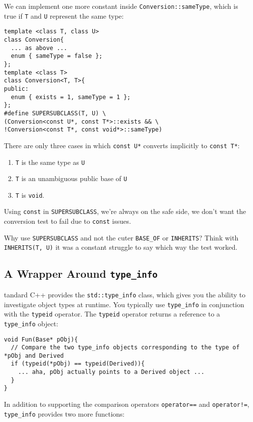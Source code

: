 We can implement one more constant inside
\texttt{Conversion::sameType}, which is true if \texttt{T} and
\texttt{U} represent the same type:

\begin{verbatim}
template <class T, class U>
class Conversion{
  ... as above ...
  enum { sameType = false };
};
template <class T>
class Conversion<T, T>{
public:
  enum { exists = 1, sameType = 1 };
};
#define SUPERSUBCLASS(T, U) \
(Conversion<const U*, const T*>::exists && \
!Conversion<const T*, const void*>::sameType)
\end{verbatim}

There are only three cases in which \texttt{const U*} converts
implicitly to \texttt{const T*}: 
\begin{enumerate}
\item \texttt{T} is the same type as \texttt{U}
\item \texttt{T} is an unambiguous public base of \texttt{U}
\item \texttt{T} is \texttt{void}.
\end{enumerate}

Using \texttt{const} in \texttt{SUPERSUBCLASS}, we're always on the
safe side, we don't want the conversion test to fail due to
\texttt{const} issues.

Why use \texttt{SUPERSUBCLASS} and not the cuter \texttt{BASE\_OF} or
\texttt{INHERITS}? Think with \texttt{INHERITS(T, U)} it was a
constant struggle to say which way the test worked.

\subsection{A Wrapper Around \texttt{type\_info} }

tandard C++ provides the \texttt{std::type\_info} class, which gives you the
ability to investigate object types at runtime. You typically use
\texttt{type\_info} in conjunction with the \texttt{typeid}
operator. The \texttt{typeid} operator returns a reference to a
\texttt{type\_info} object:

\begin{verbatim}
void Fun(Base* pObj){
  // Compare the two type_info objects corresponding to the type of *pObj and Derived
  if (typeid(*pObj) == typeid(Derived)){
    ... aha, pObj actually points to a Derived object ...
  }
}
\end{verbatim}

In addition to supporting the comparison operators \texttt{operator==}
and \texttt{operator!=}, \texttt{type\_info} provides two more
functions:

